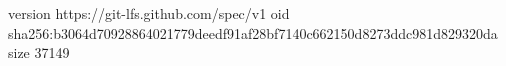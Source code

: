 version https://git-lfs.github.com/spec/v1
oid sha256:b3064d70928864021779deedf91af28bf7140c662150d8273ddc981d829320da
size 37149
